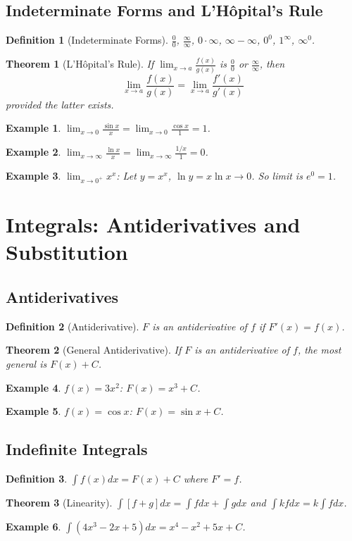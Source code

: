 \documentclass[11pt,a4paper]{article}
\newtheorem{example}{Example}
\newtheorem{theorem}{Theorem}
\newtheorem{definition}{Definition}
\begin{document}
\subsection{Indeterminate Forms and L'Hôpital's Rule}
\begin{definition}[Indeterminate Forms]
$\frac{0}{0}$, $\frac{\infty}{\infty}$, $0 \cdot \infty$, $\infty - \infty$, $0^0$, $1^\infty$, $\infty^0$.
\end{definition}
\begin{theorem}[L'Hôpital's Rule]
If $\lim_{x \to a} \frac{f(x)}{g(x)}$ is $\frac{0}{0}$ or $\frac{\infty}{\infty}$, then
\[
\lim_{x \to a} \frac{f(x)}{g(x)} = \lim_{x \to a} \frac{f'(x)}{g'(x)}
\]
provided the latter exists.
\end{theorem}
\begin{example}
$\lim_{x \to 0} \frac{\sin x}{x} = \lim_{x \to 0} \frac{\cos x}{1} = 1$.
\end{example}
\begin{example}
$\lim_{x \to \infty} \frac{\ln x}{x} = \lim_{x \to \infty} \frac{1/x}{1} = 0$.
\end{example}
\begin{example}
$\lim_{x \to 0^+} x^x$: Let $y = x^x$, $\ln y = x \ln x \to 0$. So limit is $e^0 = 1$.
\end{example}
\section{Integrals: Antiderivatives and Substitution}
\subsection{Antiderivatives}
\begin{definition}[Antiderivative]
$F$ is an antiderivative of $f$ if $F'(x) = f(x)$.
\end{definition}
\begin{theorem}[General Antiderivative]
If $F$ is an antiderivative of $f$, the most general is $F(x) + C$.
\end{theorem}
\begin{example}
$f(x) = 3x^2$: $F(x) = x^3 + C$.
\end{example}
\begin{example}
$f(x) = \cos x$: $F(x) = \sin x + C$.
\end{example}
\subsection{Indefinite Integrals}
\begin{definition}
$\int f(x) dx = F(x) + C$ where $F' = f$.
\end{definition}
\begin{theorem}[Linearity]
$\int [f+g] dx = \int f dx + \int g dx$ and $\int kf dx = k \int f dx$.
\end{theorem}
\begin{example}
$\int (4x^3 - 2x + 5) dx = x^4 - x^2 + 5x + C$.
\end{example}
\end{document}
